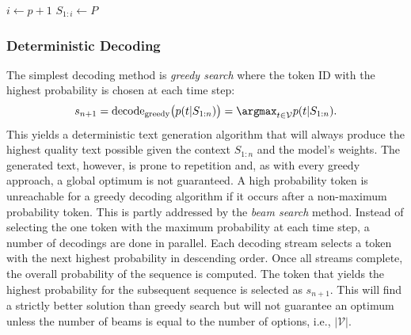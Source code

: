     \begin{algorithm}
        \caption{Decoding a \acs{llm} generated Probability Distribution}
        \label{alg:decoding}
        \DontPrintSemicolon
        \SetAlgoLined
        $i \gets p+1$\;
        $S_{1:i} \gets P$
        \Return{$[s_{p+1}, \dots, s_{p+g}]$}
    \end{algorithm}

    \subsubsection{Deterministic Decoding}
    The simplest decoding method is \emph{greedy search} where the token ID with the highest probability is chosen at each time step:
    \begin{equation}
        s_{n+1} = \text{decode}_\text{greedy} \bigl(p(t | S_{1:n}) \bigr) = \argmax_{t \in \mathcal{V}} p(t | S_{1:n}) \text{.}
    \end{equation}
    This yields a deterministic text generation algorithm that will always produce the highest quality text possible given the context $S_{1:n}$ and the model's weights.
    The generated text, however, is prone to repetition and, as with every greedy approach, a global optimum is not guaranteed.
    A high probability token is unreachable for a greedy decoding algorithm if it occurs after a non-maximum probability token.
    This is partly addressed by the \emph{beam search} method.
    Instead of selecting the one token with the maximum probability at each time step, a number of decodings are done in parallel.
    Each decoding stream selects a token with the next highest probability in descending order.
    Once all streams complete, the overall probability of the sequence is computed.
    The token that yields the highest probability for the subsequent sequence is selected as $s_{n+1}$. 
    This will find a strictly better solution than greedy search but will not guarantee an optimum unless the number of beams is equal to the number of options, i.e., $|\mathcal{V}|$.

